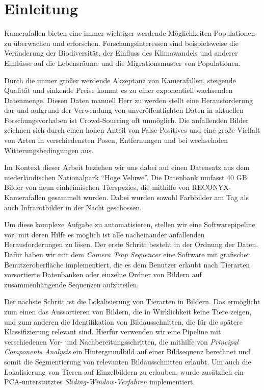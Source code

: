 \newpage
\section{Einleitung}

Kamerafallen bieten eine immer wichtiger werdende Möglichkeiten Populationen zu überwachen und erforschen. Forschungsinteressen sind beispielsweise die Veränderung der Biodiversität, der Einfluss des Klimawandels und anderer Einflüsse auf die Lebensräume und die Migrationsmuster von Populationen.

Durch die immer größer werdende Akzeptanz von Kamerafallen, steigende Qualität und sinkende Preise kommt es zu einer exponentiell wachsenden Datenmenge. Diesen Daten manuell Herr zu werden stellt eine Herausforderung dar und aufgrund der Verwendung von unveröffentlichten Daten in aktuellen Forschungsvorhaben ist Crowd-Sourcing oft unmöglich. Die anfallenden Bilder zeichnen sich durch einen hohen Anteil von False-Positives und eine große Vielfalt von Arten in verschiedensten Posen, Entfernungen und bei wechselnden Witterungsbedingungen aus. 

Im Kontext dieser Arbeit beziehen wir uns dabei auf einen Datensatz aus dem niederländischen Nationalpark \enquote{Hoge Veluwe}. Die Datenbank umfasst 40 GB Bilder von neun einheimischen Tierspezies, die mithilfe von RECONYX-Kamerafallen gesammelt wurden. Dabei wurden sowohl Farbbilder am Tag als auch Infrarotbilder in der Nacht geschossen.

Um diese komplexe Aufgabe zu automatisieren, stellen wir eine Softwarepipeline vor, mit deren Hilfe es möglich ist alle nacheinander anfallenden Herausforderungen zu lösen. Der erste Schritt besteht in der Ordnung der Daten. Dafür haben wir mit dem \emph{Camera Trap Sequencer} eine Software mit grafischer Benutzeroberfläche implementiert, die es dem Benutzer erlaubt nach Tierarten vorsortierte Datenbanken oder einzelne Ordner von Bildern auf zusammenhängende Sequenzen aufzuteilen.

Der nächste Schritt ist die Lokalisierung von Tierarten in Bildern. Das ermöglicht zum einen das Aussortieren von Bildern, die in Wirklichkeit keine Tiere zeigen, und zum anderen die Identifikation von Bildausschnitten, die für die spätere Klassifizierung relevant sind. Hierfür verwenden wir eine Pipeline mit verschiedenen Vor- und Nachbereitungsschritten, die mithilfe von \emph{Principal Components Analysis} ein Hintergrundbild auf einer Bildsequenz berechnet und somit die Segmentierung von relevanten Bildausschnitten erlaubt. Um auch die Lokalisierung von Tieren auf Einzelbildern zu erlauben, wurde zusätzlich ein PCA-unterstütztes \emph{Sliding-Window-Verfahren} implementiert. 

